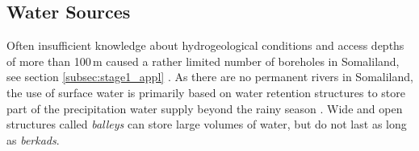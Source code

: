 \subsection{Water Sources}\label{subsec:water_sources}

Often insufficient knowledge about hydrogeological conditions and access depths of more than 100\,m caused a rather limited number of boreholes in Somaliland, see section \ref{subsec:stage1_appl} \autocite{faoswalimHydrogeologicalSurveyAssessment2012, petrucciLandscapeLandformsNorthern2022, salemTerritorialDiagnosticReport2016}. As there are no permanent rivers in Somaliland, the use of surface water is primarily based on water retention structures to store part of the precipitation water supply beyond the rainy season \autocite{petrucciLandscapeLandformsNorthern2022}. Wide and open structures called \textit{balleys} can store large volumes of water, but do not last as long as \textit{berkads}.

